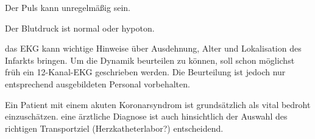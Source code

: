{\begin{ABCDEText}
   Der Puls kann unregelmäßig sein.
  \item[\ABCDE{D}]  Der Blutdruck ist normal oder hypoton.
  \item[\ABCDE{E}]  das EKG kann wichtige Hinweise über
  Ausdehnung, Alter und Lokalisation des Infarkts bringen.
  Um die Dynamik beurteilen zu können, soll schon möglichst
  früh ein 12-Kanal-EKG geschrieben werden. Die
  Beurteilung ist jedoch nur entsprechend ausgebildeten
  Personal vorbehalten.
  \item[\ABCDE{=}]  Ein Patient mit einem  akuten
  Koronarsyndrom ist grundsätzlich als vital bedroht
  einzuschätzen. eine ärztliche Diagnose ist auch
  hinsichtlich der Auswahl des richtigen Transportziel
  (Herzkatheterlabor?) entscheidend.
\end{ABCDEText}
}
{
\begin{ABCDESlide}
  \item[\ABCDE{3}] 
  \item[\ABCDE{4}] 
  \item[\ABCDE{B}] 
  \item[\ABCDE{C}] 
  \item[\ABCDE{D}] 
  \item[\ABCDE{E}] 
  \item[\ABCDE{=}] 
\end{ABCDESlide}
}
{}
{}
{}
 
